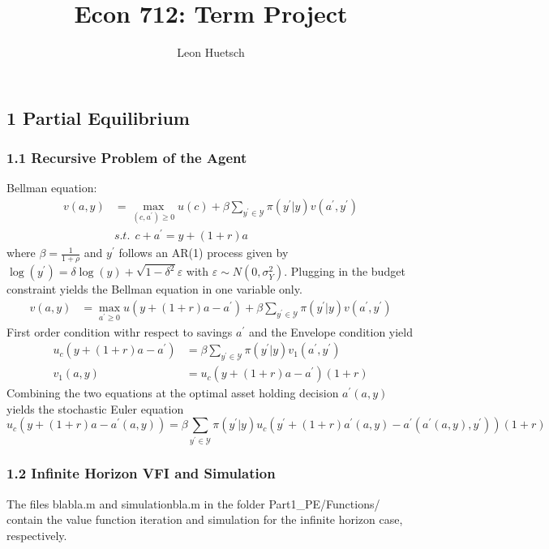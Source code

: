 \documentclass[letterpaper,12pt]{article}
\title{\fontsize{16pt}{1em}\bfseries Econ 712: Term Project}
\author{Leon Huetsch}
\begin{document}
\maketitle

\subsection*{1 Partial Equilibrium}
\subsubsection*{1.1 Recursive Problem of the Agent}
Bellman equation:
\begin{align*}
v(a,y) &= \max_{(c,a^{\prime})\ge 0} u(c) + \beta \sum_{y^{\prime} \in \mathcal{Y}} \pi \left(y^{\prime} | y \right) v(a^{\prime},y^{\prime}) \\
&\textit{s.t.} \ \ c + a^{\prime} = y + (1+r)a 
\end{align*}
where $\beta = \frac{1}{1+\rho}$ and $y^{\prime}$ follows an AR(1) process given by $\log(y^{\prime}) = \delta \log(y) + \sqrt{1-\delta^2} \varepsilon$ with $\varepsilon \sim N(0,\sigma_Y^2)$. \newline \newline
Plugging in the budget constraint yields the Bellman equation in one variable only.
\begin{align}
v(a,y) &= \max_{a^{\prime}\ge 0} u(y + (1+r)a - a^{\prime}) + \beta \sum_{y^{\prime} \in \mathcal{Y}} \pi \left(y^{\prime} | y \right) v(a^{\prime},y^{\prime})
\end{align}
First order condition withr respect to savings $a^{\prime}$ and the Envelope condition yield
\begin{align*}
u_c (y + (1+r)a - a^{\prime}) &= \beta \sum_{y^{\prime} \in \mathcal{Y}} \pi \left(y^{\prime} | y \right) v_1 (a^{\prime},y^{\prime}) \\
v_1 (a,y) &= u_c (y + (1+r)a - a^{\prime}) (1+r)
\end{align*}
Combining the two equations at the optimal asset holding decision $a^{\prime} (a,y)$ yields the stochastic Euler equation
\begin{equation}
u_c (y + (1+r)a - a^{\prime} (a,y)) = \beta \sum_{y^{\prime} \in \mathcal{Y}} \pi \left(y^{\prime} | y \right) u_c \left( y^{\prime} + (1+r) a^{\prime} (a,y) - a^{\prime} (a^{\prime} (a,y),y^{\prime}) \right) (1+r)
\end{equation}




\subsubsection*{1.2 Infinite Horizon VFI and Simulation}
The files blabla.m and simulationbla.m in the folder Part1\_PE/Functions/ contain the value function iteration and simulation for the infinite horizon case, respectively.
\end{document}
